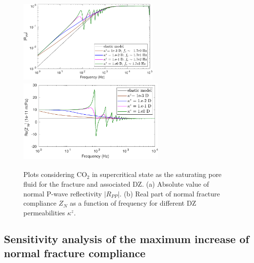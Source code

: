 \documentclass[draft]{agujournal2019}
\begin{document}
\begin{figure}[hp]
\centering
    \subcaptionbox{}
      {
       \includegraphics[width=70mm, height=43 mm]{figures/elasporo_1mm_co2fdz_ksen_h20e-2.pdf}
        }
    \subcaptionbox{}
      {
        \includegraphics[width=73mm, height=43mm]{figures/elasporo_1mm_co2fdz_znsen_h20e-2.pdf}
        }
\caption {Plots considering  CO$_2$ in supercritical state as the saturating pore fluid for the fracture and associated DZ.
(a) Absolute value of normal P-wave reflectivity $|R_{PP}|$. (b) Real part of normal fracture compliance $Z_N$ as a function of frequency for different DZ permeabilities $\kappa^z$. }
\label{fig:9}
\end{figure}

\subsection {Sensitivity analysis of the maximum increase of normal fracture compliance}
\end{document}
